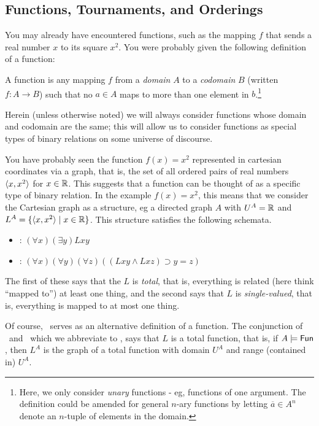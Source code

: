 \subsection*{Functions, Tournaments, and Orderings}
You may already have encountered functions, such as the mapping $f$ that sends a real number $x$ to its square $x^2$. You were probably given the following definition of a function:

\begin{definition}
A function is any mapping $f$ from a \emph{domain} $A$ to a \emph{codomain} $B$ (written $f: A \rightarrow B$) such that no $a \in A$ maps to more than one element in $b$.\footnote{Here, we only consider \emph{unary} functions - eg, functions of one argument. The definition could be amended for general $n$-ary functions by letting $\overline{a} \in A^n$ denote an $n$-tuple of elements in the domain.}
\end{definition}

Herein (unless otherwise noted) we will always consider functions whose domain and codomain are the same; this will allow us to consider functions as special types of binary relations on some universe of discourse. 

You have probably seen the function $f(x) = x^2$ represented in cartesian coordinates via a graph, that is, the set of all ordered pairs of real numbers $\mbox{$\langle x,x^2 \rangle$}$ for $x\in\mbox{$\mathbb{R}$}$. This suggests that a function can be thought of as a specific type of binary relation. In the example $f(x) = x^2$, this means that we consider the Cartesian graph as a structure, eg a directed graph $A$ with $U^A=\mbox{$\mathbb{R}$}$ and $L^A=\{\mbox{$\langle x,x^2 \rangle$} \mid x\in\mbox{$\mathbb{R}$}\}$. This structure satisfies the following schemata.
\begin{itemize}
\item
\tot: $(\forall x)(\exists y)Lxy$
\item
\sv: $(\forall x)(\forall y)(\forall z)((Lxy\wedge Lxz)\supset y=z)$
\end{itemize}

The first of these says that the $L$ is \emph{total}, that is, everything is related (here think ``mapped to'') at least one thing, and the second says that $L$ is \emph{single-valued}, that is, everything is mapped to at most one thing. 

Of course, \sv\ serves as an alternative definition of a function. The conjunction of \sv\ and \tot\, which we abbreviate to \fun, says that $L$ is a total function, that is, if $A\models\mbox{$\mathsf{Fun}$}$, then $L^A$ is the graph of a total function with domain $U^A$ and range (contained in) $U^A$. 


